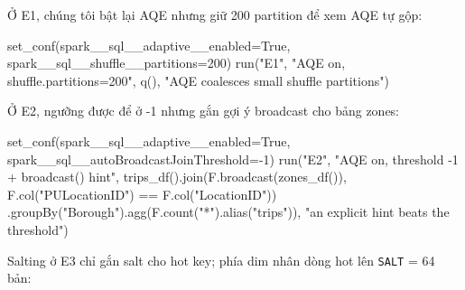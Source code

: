 \documentclass[
  12pt,
  a4paper,
]{report}
\newenvironment{Shaded}{}{}
\newcommand{\DecValTok}[1]{\textcolor[rgb]{0.25,0.63,0.44}{#1}}
\newcommand{\NormalTok}[1]{#1}
\newcommand{\OperatorTok}[1]{\textcolor[rgb]{0.40,0.40,0.40}{#1}}
\newcommand{\StringTok}[1]{\textcolor[rgb]{0.25,0.44,0.63}{#1}}
\newcommand{\VariableTok}[1]{\textcolor[rgb]{0.10,0.09,0.49}{#1}}
\begin{document}
Ở E1, chúng tôi bật lại AQE nhưng giữ 200 partition để xem AQE tự gộp:

\begin{Shaded}
\begin{Highlighting}[]
\NormalTok{set\_conf(spark\_\_sql\_\_adaptive\_\_enabled}\OperatorTok{=}\VariableTok{True}\NormalTok{, spark\_\_sql\_\_shuffle\_\_partitions}\OperatorTok{=}\DecValTok{200}\NormalTok{)}
\NormalTok{run(}\StringTok{"E1"}\NormalTok{, }\StringTok{"AQE on,  shuffle.partitions=200"}\NormalTok{, q(), }\StringTok{"AQE coalesces small shuffle partitions"}\NormalTok{)}
\end{Highlighting}
\end{Shaded}

Ở E2, ngưỡng được để ở -1 nhưng gắn gợi ý broadcast cho bảng zones:

\begin{Shaded}
\begin{Highlighting}[]
\NormalTok{set\_conf(spark\_\_sql\_\_adaptive\_\_enabled}\OperatorTok{=}\VariableTok{True}\NormalTok{, spark\_\_sql\_\_autoBroadcastJoinThreshold}\OperatorTok{={-}}\DecValTok{1}\NormalTok{)}
\NormalTok{run(}\StringTok{"E2"}\NormalTok{, }\StringTok{"AQE on,  threshold {-}1 + broadcast() hint"}\NormalTok{,}
\NormalTok{    trips\_df().join(F.broadcast(zones\_df()), F.col(}\StringTok{"PULocationID"}\NormalTok{) }\OperatorTok{==}\NormalTok{ F.col(}\StringTok{"LocationID"}\NormalTok{))}
\NormalTok{    .groupBy(}\StringTok{"Borough"}\NormalTok{).agg(F.count(}\StringTok{"*"}\NormalTok{).alias(}\StringTok{"trips"}\NormalTok{)),}
    \StringTok{"an explicit hint beats the threshold"}\NormalTok{)}
\end{Highlighting}
\end{Shaded}

Salting ở E3 chỉ gắn salt cho hot key; phía dim nhân dòng hot lên
\texttt{SALT} = 64 bản:
\end{document}
